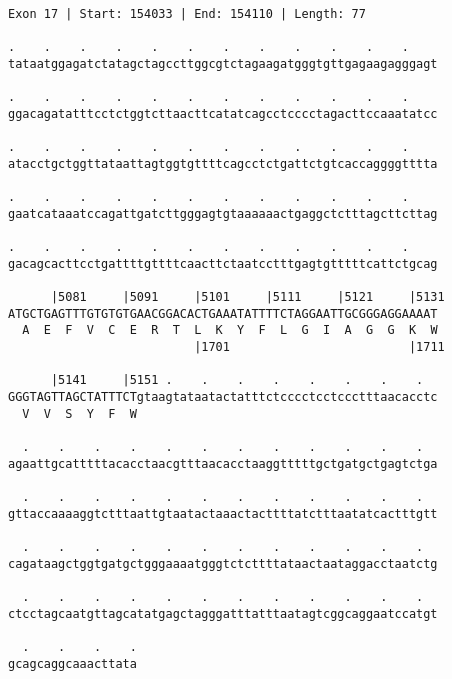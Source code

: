 \documentclass{article}
\begin{document}
\begin{Verbatim}[fontfamily=courier]
Exon 17 | Start: 154033 | End: 154110 | Length: 77

.    .    .    .    .    .    .    .    .    .    .    .    
tataatggagatctatagctagccttggcgtctagaagatgggtgttgagaagagggagt

.    .    .    .    .    .    .    .    .    .    .    .    
ggacagatatttcctctggtcttaacttcatatcagcctcccctagacttccaaatatcc

.    .    .    .    .    .    .    .    .    .    .    .    
atacctgctggttataattagtggtgttttcagcctctgattctgtcaccaggggtttta

.    .    .    .    .    .    .    .    .    .    .    .    
gaatcataaatccagattgatcttgggagtgtaaaaaactgaggctctttagcttcttag

.    .    .    .    .    .    .    .    .    .    .    .    
gacagcacttcctgattttgttttcaacttctaatcctttgagtgtttttcattctgcag

      |5081     |5091     |5101     |5111     |5121     |5131
ATGCTGAGTTTGTGTGTGAACGGACACTGAAATATTTTCTAGGAATTGCGGGAGGAAAAT
  A  E  F  V  C  E  R  T  L  K  Y  F  L  G  I  A  G  G  K  W
                          |1701                         |1711

      |5141     |5151 .    .    .    .    .    .    .    .  
GGGTAGTTAGCTATTTCTgtaagtataatactatttctcccctcctccctttaacacctc
  V  V  S  Y  F  W                                          

  .    .    .    .    .    .    .    .    .    .    .    .  
agaattgcatttttacacctaacgtttaacacctaaggtttttgctgatgctgagtctga

  .    .    .    .    .    .    .    .    .    .    .    .  
gttaccaaaaggtctttaattgtaatactaaactacttttatctttaatatcactttgtt

  .    .    .    .    .    .    .    .    .    .    .    .  
cagataagctggtgatgctgggaaaatgggtctcttttataactaataggacctaatctg

  .    .    .    .    .    .    .    .    .    .    .    .  
ctcctagcaatgttagcatatgagctagggatttatttaatagtcggcaggaatccatgt

  .    .    .    .
gcagcaggcaaacttata
\end{Verbatim}
\newpage
\end{document}

